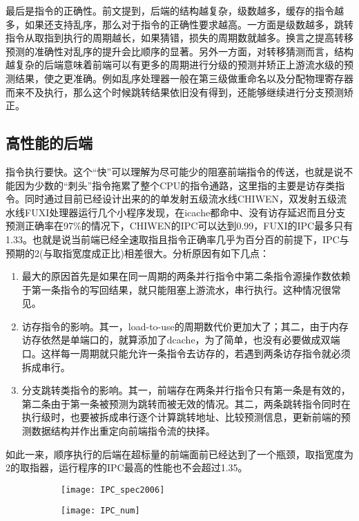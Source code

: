 	最后是指令的正确性。前文提到，后端的结构越复杂，级数越多，缓存的指令越多，如果还支持乱序，那么对于指令的正确性要求越高。一方面是级数越多，跳转指令从取指到执行的周期越长，如果猜错，损失的周期数就越多。换言之提高转移预测的准确性对乱序的提升会比顺序的显著。另外一方面，对转移猜测而言，结构越复杂的后端意味着前端可以有更多的周期进行分级的预测并矫正上游流水级的预测结果，使之更准确。例如乱序处理器一般在第三级做重命名以及分配物理寄存器而来不及执行，那么这个时候跳转结果依旧没有得到，还能够继续进行分支预测矫正。
	
	\subsection{高性能的后端}
	
	指令执行要快。这个``快''可以理解为尽可能少的阻塞前端指令的传送，也就是说不能因为少数的``刺头''指令拖累了整个CPU的指令通路，这里指的主要是访存类指令。同时通过目前已经设计出来的的单发射五级流水线CHIWEN，双发射五级流水线FUXI处理器运行几个小程序发现，在icache都命中、没有访存延迟而且分支预测正确率在97\%的情况下，CHIWEN的IPC可以达到0.99，FUXI的IPC最多只有1.33。也就是说当前端已经全速取指且指令正确率几乎为百分百的前提下，IPC与预期的2(与取指宽度成正比)相差很大。分析原因有如下几点：
	\begin{enumerate}[label=(\alph*)]
		\item 最大的原因首先是如果在同一周期的两条并行指令中第二条指令源操作数依赖于第一条指令的写回结果，就只能阻塞上游流水，串行执行。这种情况很常见。
		\item 访存指令的影响。其一，load-to-use的周期数代价更加大了；其二，由于内存访存依然是单端口的，就算添加了dcache，为了简单，也没有必要做成双端口。这样每一周期就只能允许一条指令去访存的，若遇到两条访存指令就必须拆成串行。
		\item 分支跳转类指令的影响。其一，前端存在两条并行指令只有第一条是有效的，第二条由于第一条被预测为跳转而被无效的情况。其二，两条跳转指令同时在执行级时，也要被拆成串行逐个计算跳转地址、比较预测信息，更新前端的预测数据结构并作出重定向前端指令流的抉择。
	\end{enumerate}

	如此一来，顺序执行的后端在超标量的前端面前已经达到了一个瓶颈，取指宽度为2的取指器，运行程序的IPC最高的性能也不会超过1.35。
	\begin{figure}[!htbp]
		\centering
	    \begin{subfigure}[b]{0.8\textwidth}
			\texttt{[image: IPC\_spec2006]}
			\caption{}
			\label{fig:ipc_cmp_fig}
		\end{subfigure}
		\begin{subfigure}[b]{0.8\textwidth}
			\texttt{[image: IPC\_num]}
			\caption{}
			\label{fig:ipc_cmp_tbl}
		\end{subfigure}
		\label{fig:ipc_cmp}
	\end{figure}


